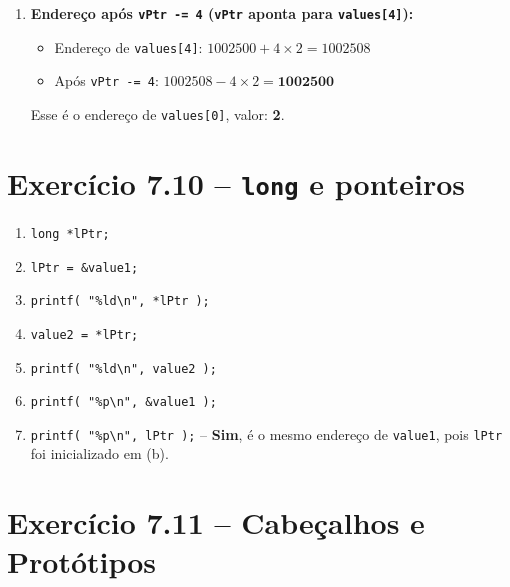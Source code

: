 \documentclass[12pt,a4paper]{article}
\begin{document}
\begin{respostabox}
\begin{enumerate}[label=\textbf{\alph*)}]
\item \textbf{Endereço após \texttt{vPtr -= 4} (\texttt{vPtr} aponta para \texttt{values[4]}):}
\begin{itemize}[noitemsep]
  \item Endereço de \texttt{values[4]}: $1002500 + 4 \times 2 = 1002508$
  \item Após \texttt{vPtr -= 4}: $1002508 - 4 \times 2 = \mathbf{1002500}$
\end{itemize}
Esse é o endereço de \texttt{values[0]}, valor: \textbf{2}.
\end{enumerate}
\end{respostabox}

\newpage

\section{Exercício 7.10 -- \texttt{long} e ponteiros}

\begin{respostabox}
\begin{enumerate}[label=\textbf{\alph*)}]
\item \texttt{long *lPtr;}
\item \texttt{lPtr = \&value1;}
\item \texttt{printf( "\%ld\textbackslash n", *lPtr );}
\item \texttt{value2 = *lPtr;}
\item \texttt{printf( "\%ld\textbackslash n", value2 );}
\item \texttt{printf( "\%p\textbackslash n", \&value1 );}
\item \texttt{printf( "\%p\textbackslash n", lPtr );} -- \textbf{Sim}, é o mesmo
endereço de \texttt{value1}, pois \texttt{lPtr} foi inicializado em (b).
\end{enumerate}
\end{respostabox}

\section{Exercício 7.11 -- Cabeçalhos e Protótipos}
\end{document}

